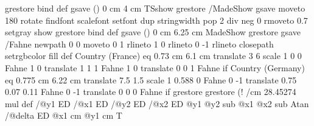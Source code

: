{{{                         grestore
                      } bind def
   gsave
      (\pst@OwnerTxt) 0 cm 4 cm TSshow
   grestore
 /MadeShow {%
                         gsave
                         moveto 180 rotate  %
                         \pst@PSfontM\space findfont \pst@fontsizeM scalefont setfont
                         dup %
                         stringwidth pop 2 div neg 0 %
                         rmoveto 0.7 setgray show
                         grestore
                      } bind def
   gsave
      (\pst@MadeTxt) 0 cm 6.25 cm MadeShow
   grestore
  gsave
           /Fahne {
                             newpath
                             0 0 moveto
                             0 1 rlineto
                             1 0 rlineto
                             0 -1 rlineto
                             closepath
                             setrgbcolor
        \tx@setTransparency fill 
                           } def
Country (France) eq {
      0.73 cm 6.1 cm translate
      3 6 scale
      1 0 0 Fahne
      1 0 translate
      1 1 1 Fahne
      1 0 translate
      0 0 1 Fahne
      } if
Country (Germany) eq {
      0.775 cm 6.22 cm translate
      7.5 1.5 scale
      1 0.588 0 Fahne
      0 -1 translate
      0.75 0.07 0.11 Fahne
      0 -1 translate
      0 0 0 Fahne
      } if
  grestore
grestore
\fi
}%
\pnode(!
    /cm {28.45274 mul} def %
    \pst@tempA \tx@UserCoor /@y1 ED /@x1 ED %
    \pst@tempB \tx@UserCoor /@y2 ED /@x2 ED %
   @y1 @y2 sub @x1 @x2 sub Atan /@delta ED %
    @x1 cm @y1 cm  T %
}

